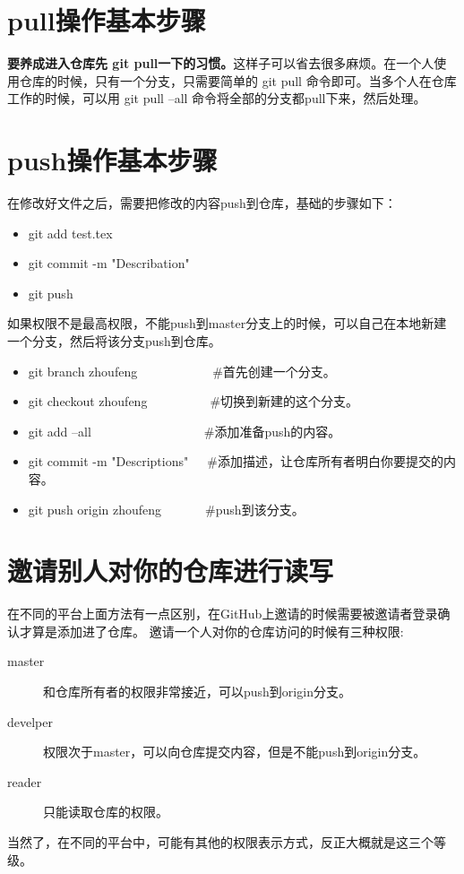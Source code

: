 \documentclass[a4paper,12pt]{ctexbook}
\begin{document}
\begin{flushleft}
\section{pull操作基本步骤}
\textbf{要养成进入仓库先 git pull一下的习惯。}这样子可以省去很多麻烦。在一个人使用仓库的时候，只有一个分支，只需要简单的 git pull 命令即可。当多个人在仓库工作的时候，可以用 git pull --all 命令将全部的分支都pull下来，然后处理。

\section{push操作基本步骤}
在修改好文件之后，需要把修改的内容push到仓库，基础的步骤如下：
\begin{itemize}
   \item git add test.tex
   \item git commit -m "Describation"
   \item git push
\end{itemize}
如果权限不是最高权限，不能push到master分支上的时候，可以自己在本地新建一个分支，然后将该分支push到仓库。
\begin{itemize}
  \item git branch zhoufeng~~~~~~~~~~~~#首先创建一个分支。
  \item git checkout zhoufeng~~~~~~~~~~#切换到新建的这个分支。
  \item git add --all~~~~~~~~~~~~~~~~~~#添加准备push的内容。
  \item git commit -m "Descriptions"~~~#添加描述，让仓库所有者明白你要提交的内容。
  \item git push origin zhoufeng~~~~~~~#push到该分支。
\end{itemize}

\section{邀请别人对你的仓库进行读写}
在不同的平台上面方法有一点区别，在GitHub上邀请的时候需要被邀请者登录确认才算是添加进了仓库。
邀请一个人对你的仓库访问的时候有三种权限:
\begin{description}
	\item[master] 和仓库所有者的权限非常接近，可以push到origin分支。
	\item[develper] 权限次于master，可以向仓库提交内容，但是不能push到origin分支。
	\item[reader] 只能读取仓库的权限。
\end{description}
当然了，在不同的平台中，可能有其他的权限表示方式，反正大概就是这三个等级。


\end{flushleft}
\end{document}
